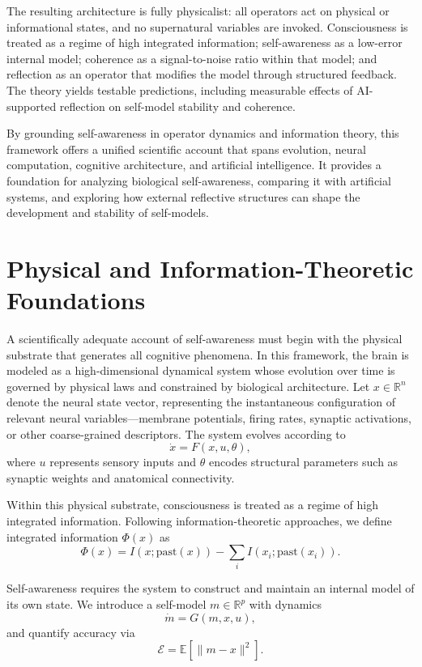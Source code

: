 \documentclass[12pt]{article}
\begin{document}
The resulting architecture is fully physicalist: all operators act on physical or informational states, and no supernatural variables are invoked. Consciousness is treated as a regime of high integrated information; self-awareness as a low-error internal model; coherence as a signal-to-noise ratio within that model; and reflection as an operator that modifies the model through structured feedback. The theory yields testable predictions, including measurable effects of AI-supported reflection on self-model stability and coherence.

By grounding self-awareness in operator dynamics and information theory, this framework offers a unified scientific account that spans evolution, neural computation, cognitive architecture, and artificial intelligence. It provides a foundation for analyzing biological self-awareness, comparing it with artificial systems, and exploring how external reflective structures can shape the development and stability of self-models.

\section{Physical and Information-Theoretic Foundations}

A scientifically adequate account of self-awareness must begin with the physical substrate that generates all cognitive phenomena. In this framework, the brain is modeled as a high-dimensional dynamical system whose evolution over time is governed by physical laws and constrained by biological architecture. Let $x \in \mathbb{R}^n$ denote the neural state vector, representing the instantaneous configuration of relevant neural variables—membrane potentials, firing rates, synaptic activations, or other coarse-grained descriptors. The system evolves according to
\[
\dot{x} = F(x, u, \theta),
\]
where $u$ represents sensory inputs and $\theta$ encodes structural parameters such as synaptic weights and anatomical connectivity.

Within this physical substrate, consciousness is treated as a regime of high integrated information. Following information-theoretic approaches, we define integrated information $\Phi(x)$ as
\[
\Phi(x) = I(x; \text{past}(x)) - \sum_i I(x_i; \text{past}(x_i)).
\]

Self-awareness requires the system to construct and maintain an internal model of its own state. We introduce a self-model $m \in \mathbb{R}^p$ with dynamics
\[
\dot{m} = G(m, x, u),
\]
and quantify accuracy via
\[
\mathcal{E} = \mathbb{E}[\|m - x\|^2].
\]
\end{document}
